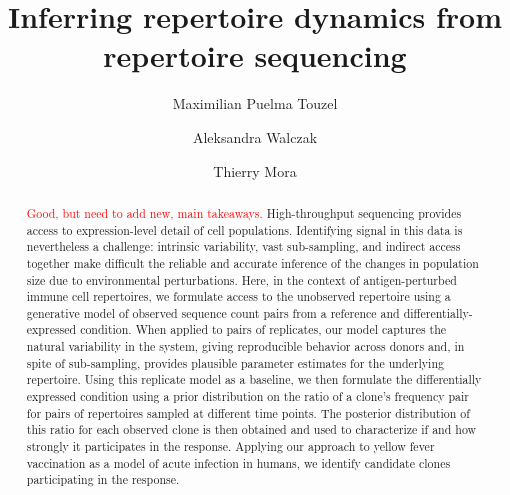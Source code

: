 \documentclass[letterpaper,english,prl,reprint,longbibliography]{revtex4-1} %
\newcommand{\re}[1]{\textcolor{red}{#1}}
\begin{document}

\title{Inferring repertoire dynamics from repertoire sequencing}

\author{Maximilian Puelma Touzel}


\author{Aleksandra Walczak}


\author{Thierry Mora}


\vspace{0.5cm}

\begin{abstract}
\re{Good, but need to add new, main takeaways.} High-throughput sequencing provides access to expression-level detail of cell populations. Identifying signal in this data is nevertheless a challenge: intrinsic variability, vast sub-sampling, and indirect access together make difficult the reliable and accurate inference of the changes in population size due to environmental perturbations. Here, in the context of antigen-perturbed immune cell repertoires, we formulate access to the unobserved repertoire using a generative model of observed sequence count pairs from a reference and differentially-expressed condition. When applied to pairs of replicates, our model captures the natural variability in the system, giving reproducible behavior across donors and, in spite of sub-sampling, provides plausible parameter estimates for the underlying repertoire. Using this replicate model as a baseline, we then formulate the differentially expressed condition using a prior distribution on the ratio of a clone’s frequency pair for pairs of repertoires sampled at different time points. The posterior distribution of this ratio for each observed clone is then obtained and used to characterize if and how strongly it participates in the response. Applying our approach to yellow fever vaccination as a model of acute infection in humans, we identify candidate clones participating in the response.   

\end{abstract}

\end{document}
